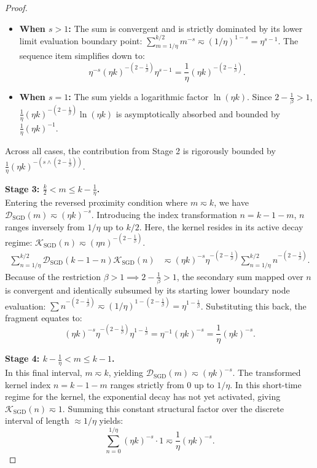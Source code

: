 \begin{proof}
\begin{itemize}
    \item \textbf{When $s > 1$:} The sum is convergent and is strictly dominated by its lower limit evaluation boundary point: $\sum_{m=1/\eta}^{k/2} m^{-s} \eqsim (1/\eta)^{1-s} = \eta^{s-1}$. The sequence item simplifies down to:
    \[
        \eta^{-s} (\eta k)^{-\left(2-\frac{1}{\beta}\right)} \eta^{s-1} = \frac{1}{\eta} (\eta k)^{-\left(2-\frac{1}{\beta}\right)}.
    \]
    
    \item \textbf{When $s = 1$:} The sum yields a logarithmic factor $\ln(\eta k)$. Since $2-\frac{1}{\beta} > 1$, $\frac{1}{\eta} (\eta k)^{-\left(2-\frac{1}{\beta}\right)} \ln(\eta k)$ is asymptotically absorbed and bounded by $\frac{1}{\eta} (\eta k)^{-1}$.
\end{itemize}
Across all cases, the contribution from Stage 2 is rigorously bounded by $\frac{1}{\eta} (\eta k)^{-\left(s \wedge \left(2-\frac{1}{\beta}\right)\right)}$.

\textbf{Stage 3: $\frac{k}{2} < m \le k - \frac{1}{\eta}$.} \\
Entering the reversed proximity condition where $m \eqsim k$, we have $\mathcal{D}_{\mathrm{SGD}}(m) \eqsim (\eta k)^{-s}$. Introducing the index transformation $n = k-1-m$, $n$ ranges inversely from $1/\eta$ up to $k/2$. Here, the kernel resides in its active decay regime: $\mathcal{K}_{\mathrm{SGD}}(n) \eqsim (\eta n)^{-\left(2-\frac{1}{\beta}\right)}$.
\begin{align*}
    \sum_{n=1/\eta}^{k/2} \mathcal{D}_{\mathrm{SGD}}(k-1-n) \mathcal{K}_{\mathrm{SGD}}(n) 
    &\eqsim (\eta k)^{-s} \eta^{-\left(2-\frac{1}{\beta}\right)} \sum_{n=1/\eta}^{k/2} n^{-\left(2-\frac{1}{\beta}\right)}.
\end{align*}
Because of the restriction $\beta > 1 \implies 2-\frac{1}{\beta} > 1$, the secondary sum mapped over $n$ is convergent and identically subsumed by its starting lower boundary node evaluation: $\sum n^{-\left(2-\frac{1}{\beta}\right)} \eqsim (1/\eta)^{1-\left(2-\frac{1}{\beta}\right)} = \eta^{1-\frac{1}{\beta}}$. Substituting this back, the fragment equates to:
\[
    (\eta k)^{-s} \eta^{-\left(2-\frac{1}{\beta}\right)} \eta^{1-\frac{1}{\beta}} = \eta^{-1} (\eta k)^{-s} = \frac{1}{\eta} (\eta k)^{-s}.
\]

\textbf{Stage 4: $k - \frac{1}{\eta} < m \le k-1$.} \\
In this final interval, $m \eqsim k$, yielding $\mathcal{D}_{\mathrm{SGD}}(m) \eqsim (\eta k)^{-s}$. The transformed kernel index $n = k-1-m$ ranges strictly from $0$ up to $1/\eta$. In this short-time regime for the kernel, the exponential decay has not yet activated, giving $\mathcal{K}_{\mathrm{SGD}}(n) \eqsim 1$.
Summing this constant structural factor over the discrete interval of length $\approx 1/\eta$ yields:
\[
    \sum_{n=0}^{1/\eta} (\eta k)^{-s} \cdot 1 \eqsim \frac{1}{\eta} (\eta k)^{-s}.
\]


\end{proof}
